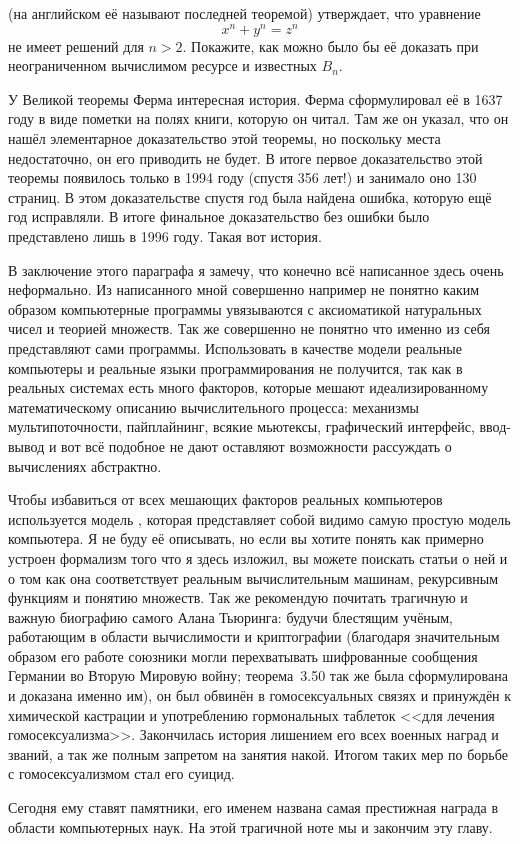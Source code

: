 \begin{exercise}
 (на английском её называют последней теоремой) утверждает, что уравнение
$$x^n + y^n = z^n$$
не имеет решений для $n>2$. Покажите, как можно было бы её доказать при неограниченном вычислимом ресурсе и известных $B_n$.
\end{exercise}

У Великой теоремы Ферма интересная история. Ферма сформулировал её в 1637 году в виде пометки на полях книги, которую он читал. Там же он указал, что он нашёл элементарное доказательство этой теоремы, но поскольку места недостаточно, он его приводить не будет. В итоге первое доказательство этой теоремы появилось только в 1994 году (спустя 356 лет!) и занимало оно 130 страниц. В этом доказательстве спустя год была найдена ошибка, которую ещё год исправляли. В итоге финальное доказательство без ошибки было представлено лишь в 1996 году. Такая вот история.

В заключение этого параграфа я замечу, что конечно всё написанное здесь очень неформально. Из написанного мной совершенно например не понятно каким образом компьютерные программы увязываются с аксиоматикой натуральных чисел и теорией множеств. Так же совершенно не понятно что именно из себя представляют сами программы. Использовать в качестве модели реальные компьютеры и реальные языки программирования не получится, так как в реальных системах есть много факторов, которые мешают идеализированному математическому описанию вычислительного процесса: механизмы мультипоточности, пайплайнинг, всякие мьютексы, графический интерфейс, ввод-вывод и вот всё подобное не дают оставляют возможности рассуждать о вычислениях абстрактно.

Чтобы избавиться от всех мешающих факторов реальных компьютеров используется модель , которая представляет собой видимо самую простую модель компьютера. Я не буду её описывать, но если вы хотите понять как примерно устроен формализм того что я здесь изложил, вы можете поискать статьи о ней и о том как она соответствует реальным вычислительным машинам, рекурсивным функциям и понятию множеств. Так же рекомендую почитать трагичную и важную биографию самого Алана Тьюринга: будучи блестящим учёным, работающим в области вычислимости и криптографии (благодаря значительным образом его работе союзники могли перехватывать шифрованные сообщения Германии во Вторую Мировую войну; теорема~3.50 так же была сформулирована и доказана именно им), он был обвинён в гомосексуальных связях и принуждён к химической кастрации и употреблению гормональных таблеток <<для лечения гомосексуализма>>. Закончилась история лишением его всех военных наград и званий, а так же полным запретом на занятия накой. Итогом таких мер по борьбе с гомосексуализмом стал его суицид.

Сегодня ему ставят памятники, его именем названа самая престижная награда в области компьютерных наук. На этой трагичной ноте мы и закончим эту главу.
